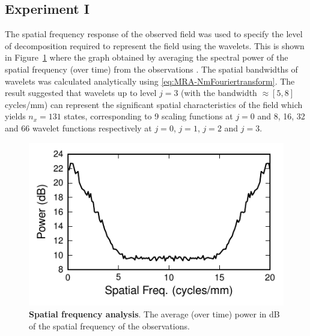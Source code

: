 \documentclass[11pt,draftcls,onecolumn,peerreview]{IEEEtran}
\begin{document}
\subsection{Experiment I}
The spatial frequency response of the observed field was used to specify the level of decomposition required to represent the field using the wavelets. This is shown in Figure~\ref{fig:ObservationFrequencyResponce} where the graph obtained by averaging the spectral power of the spatial frequency (over time) from the observations \cite{Scerri2009}. The spatial bandwidths of wavelets was calculated analytically using \eqref{eq:MRA-NmFouriertransform}. The result suggested that wavelets up to level $j=3$ (with the bandwidth $\approx[5,8]$ cycles/mm) can represent the significant spatial characteristics of the field which yields $n_x = 131$ states, corresponding to 9 scaling functions at $j=0$ and 8, 16, 32 and 66 wavelet functions respectively at $j=0$, $j=1$, $j=2$ and $j=3$. 
\begin{figure}[!h] 
 	\centering
 		\includegraphics[scale=1]{./Graph/Figure2.pdf}
 		\caption{{\bf Spatial frequency analysis}. The average (over time) power in dB of the spatial frequency of the observations.}
 	\label{fig:ObservationFrequencyResponce}
 \end{figure}
\end{document}
